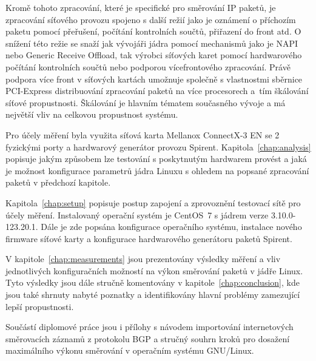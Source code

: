 \documentclass[english]{fitthesis} %
\begin{document}
Kromě tohoto zpracování, které je specifické pro směrování IP paketů, je zpracování síťového provozu
spojeno s další režií jako je oznámení o příchozím paketu pomocí přeřušení,
počítání kontrolních součtů, přiřazení do front atd.
O snížení této režie se snaží jak vývojáři jádra pomocí mechanismů jako je NAPI nebo Generic Receive Offload,
tak výrobci síťových karet pomocí hardwarového počítání kontrolních součtů nebo podporou vícefrontového zpracování.
Právě podpora více front v síťových kartách umožnuje společně s vlastnostmi sběrnice PCI-Express
distribuování zpracování paketů na více procesorech a~tím škálování síťové propustnosti.
Škálování je hlavním tématem současného vývoje a má největší vliv na celkovou propustnost systému.

Pro účely měření byla využita síťová karta Mellanox ConnectX-3 EN se 2 fyzickými porty
a hardwarový generátor provozu Spirent.
Kapitola~\ref{chap:analysis} popisuje jakým způsobem lze testování s poskytnutým hardwarem provést
a jaká je možnost konfigurace parametrů jádra Linuxu s ohledem na popsané zpracování paketů v předchozí kapitole.

Kapitola~\ref{chap:setup} popisuje postup zapojení a zprovoznění testovací sítě pro účely měření.
Instalovaný operační systém je CentOS~7 s jádrem verze 3.10.0-123.20.1. %
Dále je zde popsána konfigurace operačního systému, instalace nového firmware síťové karty a konfigurace hardwarového generátoru
paketů Spirent.

V kapitole~\ref{chap:measurements} jsou prezentovány výsledky měření a vliv jednotlivých konfiguračních možností
na výkon směrování paketů v jádře Linux.
Tyto výsledky jsou dále stručně komentovány v kapitole~\ref{chap:conclusion}, kde jsou také shrnuty nabyté poznatky
a identifikovány hlavní problémy zamezující lepší propustnosti.

Součástí diplomové práce jsou i přílohy s návodem importování internetových směrovacích záznamů z protokolu BGP
a stručný souhrn kroků pro dosažení maximálního výkonu směrování v operačním systému GNU/Linux.

  \setcounter{tocdepth}{1}
  \tableofcontents
  


\ifczech
  
\else 
  
%  
\fi
  \begin{flushleft}
  \end{flushleft}
  \appendix
  
\end{document}
